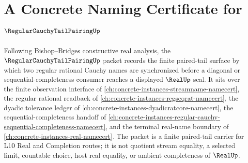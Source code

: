 \chapter{A Concrete Naming Certificate for $\RegularCauchyTailPairingUp$}
\label{ch:concrete-instances-regular-cauchy-tail-pairing-namecert}

Following Bishop--Bridges constructive real analysis, the $\RegularCauchyTailPairingUp$ packet records the finite paired-tail surface by which two regular rational Cauchy names are synchronized before a diagonal or sequential-completeness consumer reaches a displayed $\RealUp$ seal. It sits over the finite observation interface of \autoref{ch:concrete-instances-streamname-namecert}, the regular rational readback of \autoref{ch:concrete-instances-regseqrat-namecert}, the dyadic tolerance ledger of \autoref{ch:concrete-instances-dyadicratcore-namecert}, the sequential-completeness handoff of \autoref{ch:concrete-instances-regular-cauchy-sequential-completeness-namecert}, and the terminal real-name boundary of \autoref{ch:concrete-instances-real-namecert}. The packet is a finite paired-tail carrier for L10 Real and Completion routes; it is not quotient stream equality, a selected limit, countable choice, host real equality, or ambient completeness of $\RealUp$.

